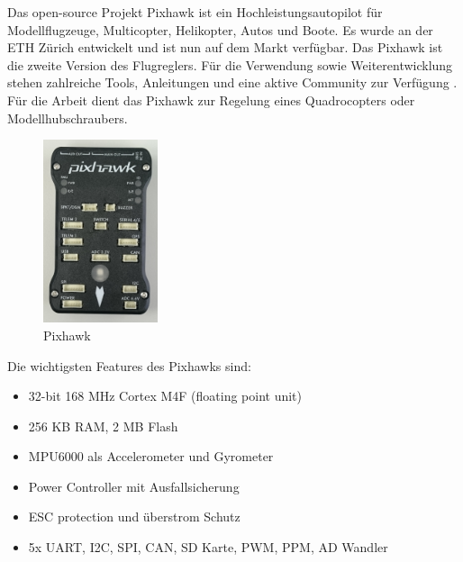 

Das open-source Projekt Pixhawk ist ein Hochleistungsautopilot für Modellflugzeuge, Multicopter, Helikopter, Autos und Boote. Es wurde an der ETH Zürich entwickelt und ist nun auf dem Markt verfügbar. Das Pixhawk ist die zweite Version des Flugreglers. Für die Verwendung sowie Weiterentwicklung stehen zahlreiche Tools, Anleitungen und eine aktive Community zur Verfügung .\\
Für die Arbeit dient das Pixhawk zur Regelung eines Quadrocopters oder Modellhubschraubers.

\begin{figure}[ht]
  \begin{center}
  \includegraphics[width=0.3\textwidth]{pic/20_pixhawk/pixhawk_alone.jpg}
  \end{center}
  \caption{Pixhawk}
\end{figure}

Die wichtigsten Features des Pixhawks sind:
\begin{itemize}
\item 32-bit 168 MHz Cortex M4F (floating point unit)
\item 256 KB RAM, 2 MB Flash
\item MPU6000 als Accelerometer und Gyrometer
\item Power Controller mit Ausfallsicherung
\item ESC protection und überstrom Schutz
\item 5x UART, I2C, SPI, CAN, SD Karte, PWM, PPM, AD Wandler
\end{itemize}



\clearpage